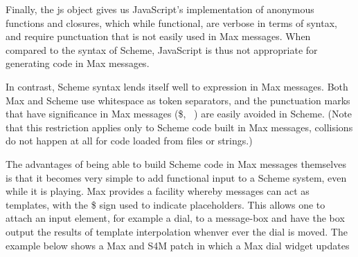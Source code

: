 \documentclass[acmsmall]{acmart}
\begin{document}
Finally, the js object gives us JavaScript's implementation of anonymous functions
and closures, which while functional, are verbose in terms of syntax, and require
punctuation that is not easily used in Max messages. When compared to the syntax
of Scheme, JavaScript is thus not appropriate for generating code in Max messages.

In contrast, Scheme syntax lends itself well to expression in Max messages. 
Both Max and Scheme use whitespace as token separators, and the punctuation marks
that have significance in Max messages (\$, \, \;) are easily avoided in Scheme.
(Note that this restriction applies only to Scheme code built in Max messages, collisions
do not happen at all for code loaded from files or strings.)

The advantages of being able to build Scheme code in Max messages themselves is
that it becomes very simple to add functional input to a Scheme system, even
while it is playing. Max provides a facility whereby messages can act as templates,
with the \$ sign used to indicate placeholders. This allows one to attach an input
element, for example a dial, to a message-box and have the box output the results
of template interpolation whenver ever the dial is moved. 
The example below shows a Max and S4M patch in which a Max dial widget updates
\end{document}
